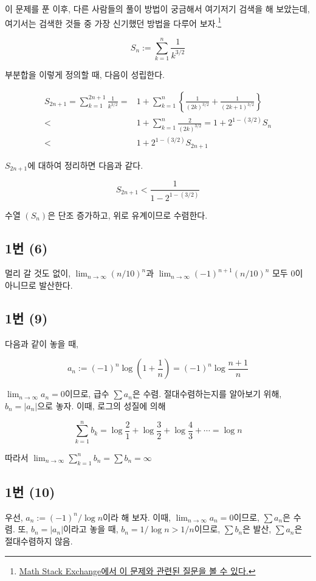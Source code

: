 이 문제를 푼 이후, 다른 사람들의 풀이 방법이 궁금해서 여기저기 검색을 해 보았는데, 여기서는 검색한 것들 중 가장 신기했던 방법을 다루어 보자.\footnote{\href{https://math.stackexchange.com/questions/29450/self-contained-proof-that-sum-limits-n-1-infty-frac1np-converges-for}{Math Stack Exchange에서 이 문제와 관련된 질문을 볼 수 있다.}}

\[
S_n:=\sum^n_{k=1}\frac{1}{k^{3/2}}
\]

부분합을 이렇게 정의할 때, 다음이 성립한다.

\begin{align*}
S_{2n+1}=\sum^{2n+1}_{k=1}\frac{1}{k^{3/2}}=&1+\sum^n_{k=1}\left\{\frac{1}{(2k)^{3/2}}+\frac{1}{(2k+1)^{3/2}}\right\}\\
<&1+\sum^n_{k=1}\frac{2}{(2k)^{3/2}}=1+2^{1-(3/2)}S_n\\
<&1+2^{1-(3/2)}S_{2n+1}
\end{align*}

$S_{2n+1}$에 대하여 정리하면 다음과 같다.

\[
S_{2n+1}<\frac{1}{1-2^{1-(3/2)}}
\]

수열 $(S_n)$은 단조 증가하고, 위로 유계이므로 수렴한다.

\subsection{1번 (6)}
멀리 갈 것도 없이, $\lim_{n\to\infty}(n/10)^n$과 $\lim_{n\to\infty}(-1)^{n+1}(n/10)^n$ 모두 0이 아니므로 발산한다.

\subsection{1번 (9)}
다음과 같이 놓을 때,

\[
a_n:=(-1)^n\log \left(1+\frac{1}{n}\right)=(-1)^n\log \frac{n+1}{n}
\]

$\lim_{n\to\infty}a_n=0$이므로, 급수 $\sum a_n$은 수렴. 절대수렴하는지를 알아보기 위해, $b_n=|a_n|$으로 놓자. 이때, 로그의 성질에 의해

\[
\sum^n_{k=1} b_k=\log \frac{2}{1}+\log \frac{3}{2}+\log \frac{4}{3}+\cdots=\log n
\]

따라서 $\lim_{n\to\infty}\sum^n_{k=1}b_n=\sum b_n=\infty$

\subsection{1번 (10)}
우선, $a_n:=(-1)^n/\log n$이라 해 보자. 이때, $\lim_{n\to\infty}a_n=0$이므로, $\sum a_n$은 수렴. 또, $b_n=|a_n|$이라고 놓을 때, $b_n=1/\log n > 1/n$이므로, $\sum b_n$은 발산, $\sum a_n$은 절대수렴하지 않음.
